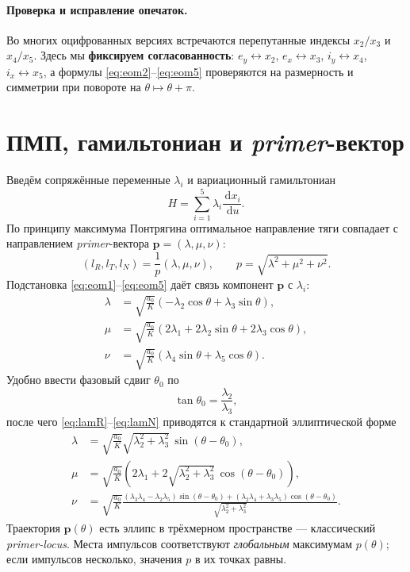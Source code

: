 \documentclass[12pt,a4paper]{article}
\newcommand{\dd}{\,\mathrm{d}}
\newcommand{\vv}[1]{\bm{#1}}
\begin{document}
\paragraph{Проверка и исправление опечаток.}
Во многих оцифрованных версиях встречаются перепутанные индексы $x_2/x_3$ и $x_4/x_5$.
Здесь мы \textbf{фиксируем согласованность}: $e_y\leftrightarrow x_2$, $e_x\leftrightarrow x_3$, $i_y\leftrightarrow x_4$, $i_x\leftrightarrow x_5$,
а формулы \eqref{eq:eom2}--\eqref{eq:eom5} проверяются на размерность и симметрии при повороте на $\theta\mapsto\theta+\pi$.

\section{ПМП, гамильтониан и \emph{primer}-вектор}
Введём сопряжённые переменные $\lambda_i$ и вариационный гамильтониан
\begin{equation}
H=\sum_{i=1}^5 \lambda_i \frac{\dd x_i}{\dd u}.
\end{equation}
По принципу максимума Понтрягина оптимальное направление тяги совпадает с направлением \emph{primer}-вектора $\vv p=(\lambda,\mu,\nu)$:
\begin{equation}
(l_R,l_T,l_N)=\frac{1}{p}(\lambda,\mu,\nu),\qquad p=\sqrt{\lambda^2+\mu^2+\nu^2}.
\end{equation}
Подстановка \eqref{eq:eom1}--\eqref{eq:eom5} даёт связь компонент $\vv p$ с $\lambda_i$:
\begin{align}
\lambda &= \sqrt{\frac{a_0}{K}}\left(-\lambda_2\cos\theta + \lambda_3\sin\theta\right), \label{eq:lamR}\\
\mu     &= \sqrt{\frac{a_0}{K}}\left(2\lambda_1 + 2\lambda_2\sin\theta + 2\lambda_3\cos\theta\right), \label{eq:lamT}\\
\nu     &= \sqrt{\frac{a_0}{K}}\left(\lambda_4\sin\theta + \lambda_5\cos\theta\right). \label{eq:lamN}
\end{align}
Удобно ввести фазовый сдвиг $\theta_0$ по
\begin{equation}
\tan\theta_0=\frac{\lambda_2}{\lambda_3},
\end{equation}
после чего \eqref{eq:lamR}--\eqref{eq:lamN} приводятся к стандартной эллиптической форме
\begin{align}
\lambda &= \sqrt{\frac{a_0}{K}}\sqrt{\lambda_2^2+\lambda_3^2}\,\sin(\theta-\theta_0),\\
\mu &= \sqrt{\frac{a_0}{K}}\left(2\lambda_1 + 2\sqrt{\lambda_2^2+\lambda_3^2}\,\cos(\theta-\theta_0)\right),\\
\nu &= \sqrt{\frac{a_0}{K}}\frac{(\lambda_3\lambda_4-\lambda_2\lambda_5)\sin(\theta-\theta_0) + (\lambda_2\lambda_4+\lambda_3\lambda_5)\cos(\theta-\theta_0)}{\sqrt{\lambda_2^2+\lambda_3^2}}.
\end{align}
Траектория $\vv p(\theta)$ есть эллипс в трёхмерном пространстве --- классический \emph{primer-locus}. Места импульсов соответствуют \emph{глобальным} максимумам $p(\theta)$; если импульсов несколько, значения $p$ в их точках равны.
\end{document}
